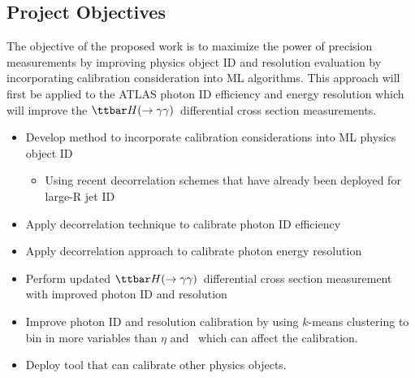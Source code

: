 \documentclass[letter, USenglish, 11pt, subfigure]{article}
\newcommand{\tthyy}{\ensuremath{\ttbar H(\to\gamma\gamma)}}
\begin{document}
\subsection*{Project Objectives}
The objective of the proposed work is to maximize the power of precision measurements by improving physics object ID and resolution evaluation by incorporating calibration consideration into ML algorithms. This approach will first be applied to the ATLAS photon ID efficiency and energy resolution which will improve the \tthyy\ differential cross section measurements. 
\begin{itemize}
\item Develop method to incorporate calibration considerations into ML physics object ID
  \begin{itemize}
    \item Using recent decorrelation schemes that have already been deployed for large-R jet ID
    \end{itemize}
  \item Apply decorrelation technique to calibrate photon ID efficiency
  \item Apply decorrelation approach to calibrate photon energy resolution
  \item Perform updated \tthyy\ differential cross section measurement with improved photon ID and resolution
  \item Improve photon ID and resolution calibration by using $k$-means clustering to bin in more variables than $\eta$ and \pt\ which can affect the calibration.
  \item Deploy tool that can calibrate other physics objects. 
\end{itemize}

\printbibliography
\end{document}
